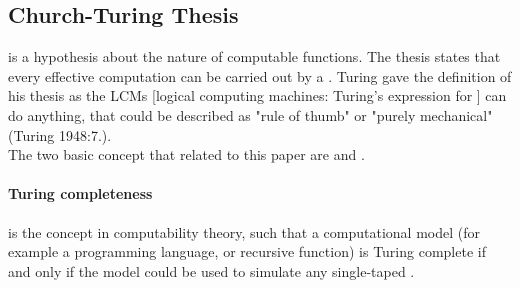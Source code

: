\subsection{Church-Turing Thesis}
 is a hypothesis about the nature of computable functions\cite{church_unsolvable_1936}.
The thesis states that every effective computation can be carried out by a \cite{copeland_church-turing_2002}.
Turing gave the definition of his thesis as the LCMs [logical computing machines: Turing's expression for ] can do anything, that could be described as "rule of thumb" or "purely mechanical" (Turing 1948:7.)\cite{copeland_church-turing_2002}.\\
The two basic concept that related to this paper are  and .
\paragraph{Turing completeness} is the concept in computability theory, such that a computational model (for example a programming language, or recursive function) is Turing complete if and only if the model could be used to simulate any single-taped \cite{rogers_theory_1987}.
